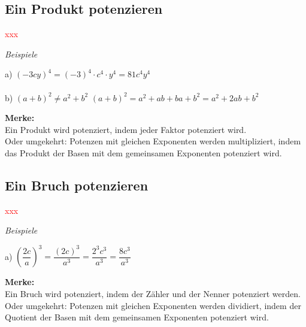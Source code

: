 \documentclass[11pt, a4paper, twoside, fleqn]{article}
\begin{document}
\subsection{Ein Produkt potenzieren}
\textcolor{red}{xxx} 
\begin{flushleft}
\emph{Beispiele} 
\end{flushleft}
a) \((-3cy)^4 = (-3)^4 \cdot c^4 \cdot y^4 = 81c^4 y^4\) \\~\\
b) \((a+b)^2 \neq a^2 + b^2\)  \((a+b)^2 = a^2 + ab +ba +b^2 = a^2 + 2ab +b^2\)
\begin{flushleft}
\textbf{Merke:} \\
Ein Produkt wird potenziert, indem jeder Faktor potenziert wird. \\
Oder umgekehrt: Potenzen mit gleichen Exponenten werden multipliziert, indem das Produkt der Basen mit dem gemeinsamen Exponenten potenziert wird.
\end{flushleft}
\subsection{Ein Bruch potenzieren}
\textcolor{red}{xxx} 
\begin{flushleft}
\emph{Beispiele}
\end{flushleft}
a) \(\left(\dfrac{2c}{a}\right)^3 = \dfrac{(2c)^3}{a^3} = \dfrac{2^3 c^3}{a^3}= \dfrac{8c^3}{a^3}\)
\begin{flushleft}
\textbf{Merke:} \\
Ein Bruch wird potenziert, indem der Zähler und der Nenner potenziert werden.\\
Oder umgekehrt: Potenzen mit gleichen Exponenten werden dividiert, indem der Quotient der Basen mit dem gemeinsamen Exponenten potenziert wird.
\end{flushleft}
\newpage
\end{document}
